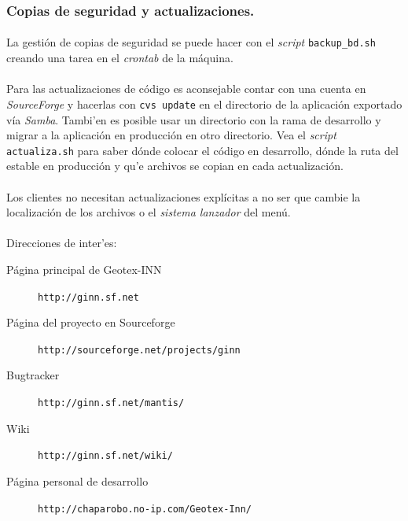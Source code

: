 \documentclass[a4paper]{article}
\newcommand{\marginalnote}[1]{\mbox{}\marginpar{\raggedright\hspace{0pt}#1}}
\newcommand{\iconomargen}[2]{%
  \marginalnote{%
    \parbox[t][\baselineskip * (#1-1)][b]{\marginparwidth}{%
      \texttt{[image: \#2]}%
    }
  }
}
\begin{document}
        \subsubsection{Copias de seguridad y actualizaciones.}
        \paragraph{}
        La gestión de copias de seguridad se puede hacer con el \emph{script} \texttt{backup\_bd.sh} creando una tarea en el \emph{crontab} de la máquina.
        \paragraph{}
        Para las actualizaciones de código es aconsejable contar con una cuenta en \emph{SourceForge} y hacerlas con \texttt{cvs update} en el directorio de la aplicación exportado vía \emph{Samba}. Tambi'en es posible usar un directorio con la rama de desarrollo y migrar a la aplicación en producción en otro directorio. Vea el \emph{script} \texttt{actualiza.sh} para saber dónde colocar el código en desarrollo, dónde la ruta del estable en producción y qu'e archivos se copian en cada actualización.
        \paragraph{}
        Los clientes no necesitan actualizaciones explícitas a no ser que cambie la localización de los archivos o el \textit{sistema lanzador} del menú.
        \paragraph{}
        Direcciones de inter'es:
\iconomargen{3}{link}
        \begin{description}
        \item [Página principal de Geotex-INN] \texttt{http://ginn.sf.net}
        \item [Página del proyecto en Sourceforge] \texttt{http://sourceforge.net/projects/ginn}
        \item [Bugtracker] \texttt{http://ginn.sf.net/mantis/}
        \item [Wiki] \texttt{http://ginn.sf.net/wiki/}
        \item [Página personal de desarrollo] \texttt{http://chaparobo.no-ip.com/Geotex-Inn/}
        \end{description}
\end{document}
